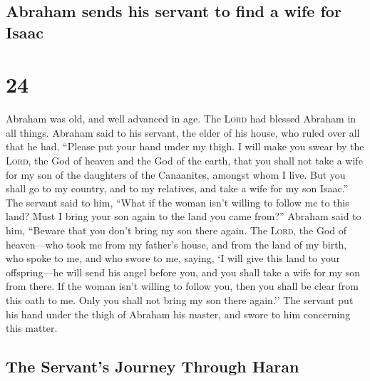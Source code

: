 \hypertarget{abraham-sends-his-servant-to-find-a-wife-for-isaac}{%
\subsection{Abraham sends his servant to find a wife for
Isaac}\label{abraham-sends-his-servant-to-find-a-wife-for-isaac}}

\hypertarget{section-23}{%
\section{24}\label{section-23}}

 Abraham was old, and well advanced in age. The
\textsc{Lord} had blessed Abraham in all things.  Abraham
said to his servant, the elder of his house, who ruled over all that he
had, ``Please put your hand under my thigh.  I will make
you swear by the \textsc{Lord}, the God of heaven and the God of the
earth, that you shall not take a wife for my son of the daughters of the
Canaanites, amongst whom I live.  But you shall go to my
country, and to my relatives, and take a wife for my son Isaac.''
 The servant said to him, ``What if the woman isn't
willing to follow me to this land? Must I bring your son again to the
land you came from?''  Abraham said to him, ``Beware that
you don't bring my son there again.  The \textsc{Lord},
the God of heaven---who took me from my father's house, and from the
land of my birth, who spoke to me, and who swore to me, saying, `I will
give this land to your offspring---he will send his angel before you,
and you shall take a wife for my son from there.  If the
woman isn't willing to follow you, then you shall be clear from this
oath to me. Only you shall not bring my son there again.''
 The servant put his hand under the thigh of Abraham his
master, and swore to him concerning this matter.

\hypertarget{the-servants-journey-through-haran}{%
\subsection{The Servant's Journey Through
Haran}\label{the-servants-journey-through-haran}}

